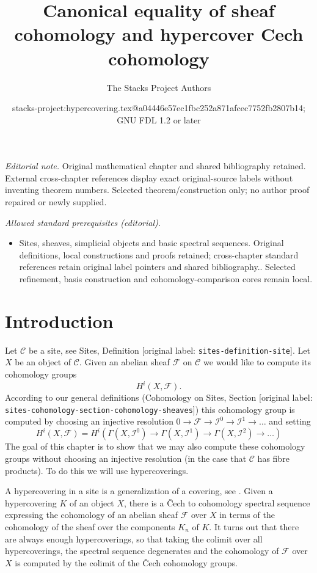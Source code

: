 \documentclass[10pt,a4paper]{article}
\title{Canonical equality of sheaf cohomology and hypercover Cech cohomology}
\author{The Stacks Project Authors}
\date{stacks-project:hypercovering.tex@a04446e57ec1fbc252a871afcec7752fb2807b14; GNU FDL 1.2 or later}
\theoremstyle{plain}
\theoremstyle{definition}
\theoremstyle{remark}
\numberwithin{equation}{subsection}
\begin{document}
\maketitle
\noindent\textit{Editorial note.} Original mathematical chapter and shared bibliography retained. External cross-chapter references display exact original-source labels without inventing theorem numbers. Selected theorem/construction only; no author proof repaired or newly supplied.\par\medskip
\noindent\textit{Allowed standard prerequisites (editorial).}\begin{itemize}
\item Sites, sheaves, simplicial objects and basic spectral sequences. Original definitions, local constructions and proofs retained; cross-chapter standard references retain original label pointers and shared bibliography.. Selected refinement, basis construction and cohomology-comparison cores remain local.
\end{itemize}\medskip
\section{Introduction}
\label{section-introduction}

\noindent
Let $\mathcal{C}$ be a site, see Sites, Definition \textnormal{[original label: \nolinkurl{sites-definition-site}]}.
Let $X$ be an object of $\mathcal{C}$.
Given an abelian sheaf $\mathcal{F}$
on $\mathcal{C}$ we would like to compute
its cohomology groups
$$
H^i(X, \mathcal{F}).
$$
According to our general definitions (Cohomology on Sites, Section
\textnormal{[original label: \nolinkurl{sites-cohomology-section-cohomology-sheaves}]})
this cohomology group is computed by
choosing an injective resolution
$
0 \to \mathcal{F} \to \mathcal{I}^0 \to \mathcal{I}^1 \to \ldots
$
and setting
$$
H^i(X, \mathcal{F})
=
H^i(
\Gamma(X, \mathcal{I}^0) \to
\Gamma(X, \mathcal{I}^1) \to
\Gamma(X, \mathcal{I}^2)\to \ldots)
$$
The goal of this chapter is to show that we may also compute these
cohomology groups without choosing an injective resolution
(in the case that $\mathcal{C}$ has fibre products). To do this
we will use hypercoverings.

\medskip\noindent
A hypercovering in a site is a generalization of a covering, see
\cite[Expos\'e V, Sec. 7]{SGA4}. Given a hypercovering $K$ of an object
$X$, there is a {\v C}ech to cohomology spectral sequence
expressing the cohomology of an abelian sheaf $\mathcal{F}$
over $X$ in terms of the cohomology of the sheaf over the
components $K_n$ of $K$. It turns out that there are always
enough hypercoverings, so that taking the colimit over all hypercoverings,
the spectral sequence degenerates and the cohomology of $\mathcal{F}$
over $X$ is computed by the colimit of the {\v C}ech cohomology groups.
\end{document}
